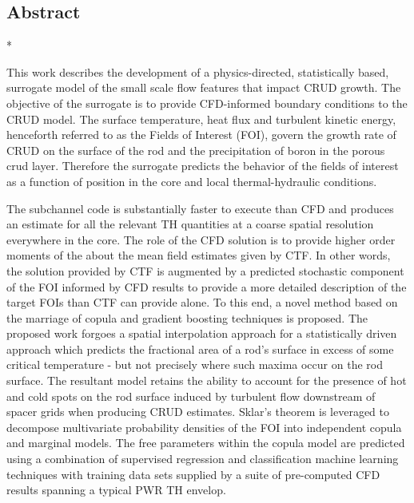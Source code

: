 \subsection{Abstract}*

This work describes the development of a physics-directed, statistically based,
surrogate model of the small scale flow features that impact CRUD growth. The objective of the surrogate
is to provide CFD-informed boundary conditions to the CRUD model. The surface temperature, heat
flux and turbulent kinetic energy, henceforth referred to as the Fields of Interest (FOI),
govern the growth rate of CRUD on the surface of the rod and the
precipitation of boron in the porous crud layer. Therefore the surrogate predicts the behavior of the
fields of interest as a function of position in the core and local thermal-hydraulic conditions.

The subchannel code is substantially faster to execute than CFD
and produces an estimate for all the relevant TH quantities at a coarse spatial resolution everywhere in
the core. The role of the CFD solution is to provide higher order moments of the about the mean field estimates
given by CTF. In other words, the solution provided by CTF is augmented by a predicted stochastic
component of the FOI informed by CFD results to provide a more detailed description of the target
FOIs than CTF can provide alone. To this end, a novel method based on the marriage of copula and
gradient boosting techniques is proposed. The proposed work forgoes a spatial interpolation approach
for a statistically driven approach which predicts the fractional area of a rod’s surface in excess of some
critical temperature - but not precisely where such maxima occur on the rod surface.
The resultant model retains the ability to account for the presence
of hot and cold spots on the rod surface induced by turbulent flow downstream of spacer grids when
producing CRUD estimates. Sklar’s theorem is leveraged to decompose multivariate probability densities
of the FOI into independent copula and marginal models. The free parameters within the copula model
are predicted using a combination of supervised regression and classification machine learning techniques
with training data sets supplied by a suite of pre-computed CFD results spanning a typical PWR TH
envelop.
